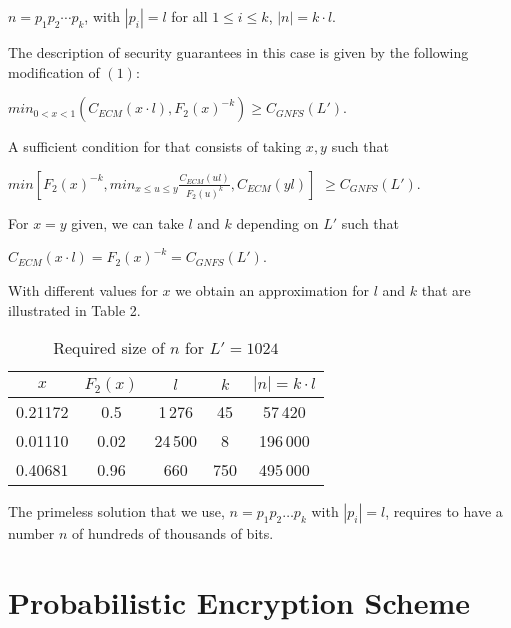 \documentclass[11pt, a4paper, twoside, openright]{report}
\begin{document}
		\hspace{20mm} $n= p_1 p_2 \cdots p_k$, with $|p_i| =l$ for all $1 \leq i \leq k$, $|n| = k \cdot l$. 

		The description of security guarantees in this case is given by the following modification of $(1)$:

		\hspace{30mm} $min_{0 < x < 1}(C_{ECM}(x \cdot l), F_2(x)^{-k}) \geq C_{GNFS}(L')$.
		
		A sufficient condition for that consists of taking $x, y$ such that 
		
		$min [F_2(x)^{-k}, min_{x \leq u \leq y} \frac{C_{ECM}(ul)}{F_2(u)^k}, C_{ECM}(yl)]$ $\geq C_{GNFS}(L')$. 
		
		\bigskip
		
		For $x=y$ given, we can take $l$ and $k$ depending on $L'$ such that 

		\hspace{30mm} $C_{ECM}(x \cdot l) = F_2(x)^{-k} = C_{GNFS}(L')$. 


		With different values for $x$ we obtain an approximation for $l$ and $k$ that are illustrated in Table 2. 

	  	\begin{table}
 		\begin{center}
 		
 		\begin{tabular}{ | c | c | c | c | c |}
 		
 		\hline
 		  $x$  & $F_2(x)$ & $l$ & $k$ & $|n| = k \cdot l$ \\
 		\hline
 		0.21172 & 0.5 &  1$\,$276 & 45 &  57\,420 \\
 		\hline
 		0.01110 & 0.02 & 24\,500& 8  & 196\,000 \\
 		\hline
 		0.40681 & 0.96 & 660 & 750 & 495\,000 \\
 		\hline 
 		
 		\end{tabular}
 		\label{table2}
 		\caption{Required size of $n$ for $L'= 1024$}  
 		\end{center}
 		\end{table}
 		

		The primeless solution that we use, $n = p_1 p_2 \ldots p_k$ with $|p_i| =l$, requires to have a number $n$ of hundreds of thousands of bits. 
 		
 		
 \clearpage	

\section{Probabilistic Encryption Scheme}
\end{document}
